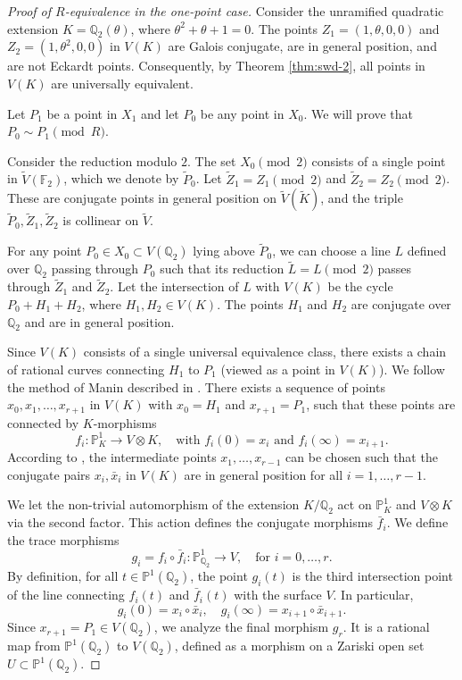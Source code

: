 \documentclass[11pt]{article}
\theoremstyle{definition}
\begin{document}
\begin{proof}[Proof of $R$-equivalence in the one-point case]
Consider the unramified quadratic extension $K = \mathbb{Q}_2(\theta)$, where $\theta^2 + \theta + 1 = 0$. The points $Z_1 = (1, \theta, 0, 0)$ and $Z_2 = (1, \theta^2, 0, 0)$ in $V(K)$ are Galois conjugate, are in general position, and are not Eckardt points. Consequently, by Theorem \ref{thm:swd-2}, all points in $V(K)$ are universally equivalent.

Let $P_1$ be a point in $X_1$ and let $P_0$ be any point in $X_0$. We will prove that $P_0 \sim P_1 \pmod R$.

Consider the reduction modulo $2$. The set $X_0 \pmod 2$ consists of a single point in $\tilde{V}(\mathbb{F}_2)$, which we denote by $\tilde{P}_0$. Let $\tilde{Z}_1 = Z_1 \pmod 2$ and $\tilde{Z}_2 = Z_2 \pmod 2$. These are conjugate points in general position on $\tilde{V}(\tilde{K})$, and the triple $\tilde{P}_0, \tilde{Z}_1, \tilde{Z}_2$ is collinear on $\tilde{V}$.

For any point $P_0 \in X_0 \subset V(\mathbb{Q}_2)$ lying above $\tilde{P}_0$, we can choose a line $L$ defined over $\mathbb{Q}_2$ passing through $P_0$ such that its reduction $\tilde{L} = L \pmod 2$ passes through $\tilde{Z}_1$ and $\tilde{Z}_2$. Let the intersection of $L$ with $V(K)$ be the cycle $P_0 + H_1 + H_2$, where $H_1, H_2 \in V(K)$. The points $H_1$ and $H_2$ are conjugate over $\mathbb{Q}_2$ and are in general position.

Since $V(K)$ consists of a single universal equivalence class, there exists a chain of rational curves connecting $H_1$ to $P_1$ (viewed as a point in $V(K)$). We follow the method of Manin described in \cite[Section 15.1.3]{manin3}. There exists a sequence of points $x_0, x_1, \dots, x_{r+1}$ in $V(K)$ with $x_0 = H_1$ and $x_{r+1} = P_1$, such that these points are connected by $K$-morphisms
\[
f_i: \mathbb{P}_K^1 \to V \otimes K, \quad \text{with } f_i(0) = x_i \text{ and } f_i(\infty) = x_{i+1}.
\]
According to \cite[\S 15.1.3.iii]{manin3}, the intermediate points $x_1, \dots, x_{r-1}$ can be chosen such that the conjugate pairs $x_i, \bar{x}_i$ in $V(K)$ are in general position for all $i = 1, \dots, r-1$.

We let the non-trivial automorphism of the extension $K/\mathbb{Q}_2$ act on $\mathbb{P}_K^1$ and $V \otimes K$ via the second factor. This action defines the conjugate morphisms $\bar{f}_i$. We define the trace morphisms
\[
g_i = f_i \circ \bar{f}_i : \mathbb{P}_{\mathbb{Q}_2}^1 \to V, \quad \text{for } i = 0, \dots, r.
\]
By definition, for all $t \in \mathbb{P}^1(\mathbb{Q}_2)$, the point $g_i(t)$ is the third intersection point of the line connecting $f_i(t)$ and $\bar{f}_i(t)$ with the surface $V$. In particular,
\[
g_i(0) = x_i \circ \bar{x}_i, \quad g_i(\infty) = x_{i+1} \circ \bar{x}_{i+1}.
\]
Since $x_{r+1} = P_1 \in V(\mathbb{Q}_2)$, we analyze the final morphism $g_r$. It is a rational map from $\mathbb{P}^1(\mathbb{Q}_2)$ to $V(\mathbb{Q}_2)$, defined as a morphism on a Zariski open set $U \subset \mathbb{P}^1(\mathbb{Q}_2)$.


\end{proof}
\end{document}
